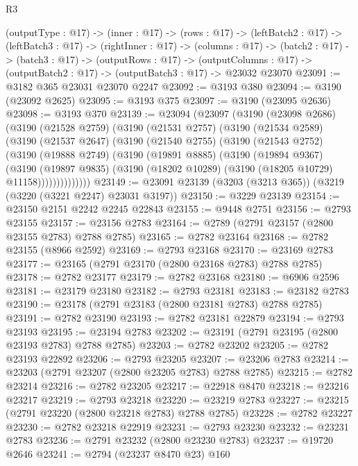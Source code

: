 \begin{lexlean}{R3}
\begin{coremodule}
  (outputType : @17) ->
  (inner : @17) ->
  (rows : @17) ->
  (leftBatch2 : @17) ->
  (leftBatch3 : @17) ->
  (rightInner : @17) ->
  (columns : @17) ->
  (batch2 : @17) ->
  (batch3 : @17) ->
  (outputRows : @17) ->
  (outputColumns : @17) -> (outputBatch2 : @17) -> (outputBatch3 : @17) -> @23032 @23070
@23091 := @3182 @365 @23031 @23070 @2247
@23092 := @3193 @380
@23094 := @3190 (@23092 @2625)
@23095 := @3193 @375
@23097 := @3190 (@23095 @2636)
@23098 := @3193 @370
@23139 := @23094
    (@23097
      (@3190
        (@23098 @2686)
        (@3190
          (@21528 @2759)
          (@3190
            (@21531 @2757)
            (@3190
              (@21534 @2589)
              (@3190
                (@21537 @2647)
                (@3190
                  (@21540 @2755)
                  (@3190
                    (@21543 @2752)
                    (@3190
                      (@19888 @2749)
                      (@3190
                        (@19891 @8885)
                        (@3190
                          (@19894 @9367)
                          (@3190
                            (@19897 @9835)
                            (@3190 (@18202 @10289) (@3190 (@18205 @10729) @11158))))))))))))))
@23149 := @23091 @23139 (@3203 (@3213 @365)) (@3219 (@3220 (@3221 @2247) @23031 @3197))
@23150 := @3229 @23139
@23154 := @23150 @2151 @2242 @2245 @22843
@23155 := @9448 @2751
@23156 := @2793 @23155
@23157 := @23156 @2783
@23164 := @2789 (@2791 @23157 (@2800 @23155 @2783) @2788 @2785)
@23165 := @2782 @23164
@23168 := @2782 @23155 (@8966 @2592)
@23169 := @2793 @23168
@23170 := @23169 @2783
@23177 := @23165 (@2791 @23170 (@2800 @23168 @2783) @2788 @2785)
@23178 := @2782 @23177
@23179 := @2782 @23168
@23180 := @6906 @2596
@23181 := @23179 @23180
@23182 := @2793 @23181
@23183 := @23182 @2783
@23190 := @23178 (@2791 @23183 (@2800 @23181 @2783) @2788 @2785)
@23191 := @2782 @23190
@23193 := @2782 @23181 @22879
@23194 := @2793 @23193
@23195 := @23194 @2783
@23202 := @23191 (@2791 @23195 (@2800 @23193 @2783) @2788 @2785)
@23203 := @2782 @23202
@23205 := @2782 @23193 @22892
@23206 := @2793 @23205
@23207 := @23206 @2783
@23214 := @23203 (@2791 @23207 (@2800 @23205 @2783) @2788 @2785)
@23215 := @2782 @23214
@23216 := @2782 @23205
@23217 := @22918 @8470
@23218 := @23216 @23217
@23219 := @2793 @23218
@23220 := @23219 @2783
@23227 := @23215 (@2791 @23220 (@2800 @23218 @2783) @2788 @2785)
@23228 := @2782 @23227
@23230 := @2782 @23218 @22919
@23231 := @2793 @23230
@23232 := @23231 @2783
@23236 := @2791 @23232 (@2800 @23230 @2783)
@23237 := @19720 @2646
@23241 := @2794 (@23237 @8470 @23) @160

\end{coremodule}
\end{lexlean}
